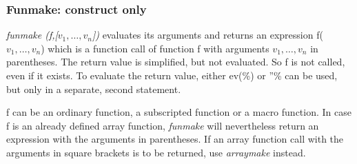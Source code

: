 \documentclass[../Maxima_Workbook.tex]{subfiles}
\begin{document}
\subsubsection{Funmake: construct only}

 \hfill \tcr{[function]} 

\lz \emph{funmake (f,[$ v_1,\dots,v_n $])} evaluates its arguments and returns an expression f($ v_1, \dots, v_n $) which is a function call of function f with arguments $ v_1,\dots,v_n $ in parentheses. The return value is simplified, but not evaluated. So f is not called, even if it exists. To evaluate the return value, either ev(\%) or ''\% can be used, but only in a separate, second statement.

\lz f can be an ordinary function, a subscripted function or a macro function. In case f is an already defined array function, \emph{funmake} will nevertheless return an expression with the arguments in parentheses. If an array function call with the arguments in square brackets is to be returned, use \emph{arraymake} instead.
\end{document}

